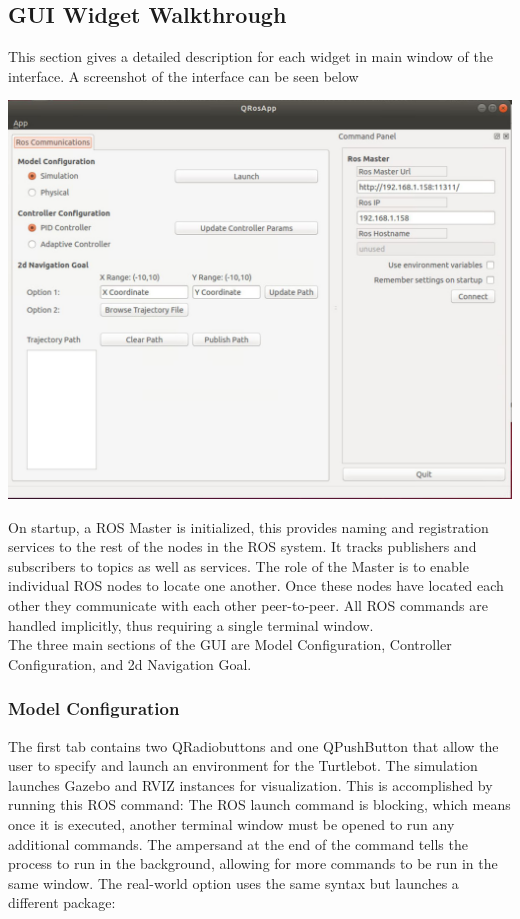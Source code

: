 \documentclass[12]{article}
\begin{document}
\subsection{GUI Widget Walkthrough}
This section gives a detailed description for each widget in main window of the interface. A screenshot of the interface can be seen below
\begin{center}
\includegraphics[width=0.9\linewidth]{images/gui_screenshot.JPG} \\
\end{center}
On startup, a ROS Master is initialized, this provides naming and registration services to the rest of the nodes in the ROS system. It tracks publishers and subscribers to topics as well as services. The role of the Master is to enable individual ROS nodes to locate one another. Once these nodes have located each other they communicate with each other peer-to-peer. All ROS commands are handled implicitly, thus requiring a single terminal window.\\

The three main sections of the GUI are Model Configuration, Controller Configuration, and 2d Navigation Goal.\\

\subsubsection{Model Configuration}
The first tab contains two QRadiobuttons and one QPushButton that allow the user to specify and launch an environment for the Turtlebot. The simulation launches Gazebo and RVIZ instances for visualization. This is accomplished by running this ROS command:
%
The ROS launch command is blocking, which means once it is executed, another terminal window must be opened to run any additional commands. The ampersand at the end of the command tells the process to run in the background, allowing for more commands to be run in the same window. The real-world option uses the same syntax but launches a different package:
%
\end{document}
